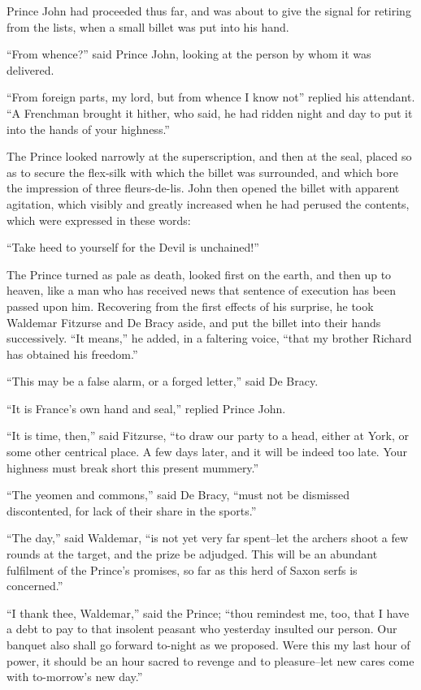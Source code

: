 Prince John had proceeded thus far, and was about to give the signal for
retiring from the lists, when a small billet was put into his hand.

``From whence?'' said Prince John, looking at the person by whom it was
delivered.

``From foreign parts, my lord, but from whence I know not'' replied his
attendant. ``A Frenchman brought it hither, who said, he had ridden
night and day to put it into the hands of your highness.''

The Prince looked narrowly at the superscription, and then at the seal,
placed so as to secure the flex-silk with which the billet was
surrounded, and which bore the impression of three fleurs-de-lis. John
then opened the billet with apparent agitation, which visibly and
greatly increased when he had perused the contents, which were expressed
in these words:

``Take heed to yourself for the Devil is unchained!''

The Prince turned as pale as death, looked first on the earth, and then
up to heaven, like a man who has received news that sentence of
execution has been passed upon him. Recovering from the first effects of
his surprise, he took Waldemar Fitzurse and De Bracy aside, and put the
billet into their hands successively. ``It means,'' he added, in a
faltering voice, ``that my brother Richard has obtained his freedom.''

``This may be a false alarm, or a forged letter,'' said De Bracy.

``It is France's own hand and seal,'' replied Prince John.

``It is time, then,'' said Fitzurse, ``to draw our party to a head,
either at York, or some other centrical place. A few days later, and it
will be indeed too late. Your highness must break short this present
mummery.''

``The yeomen and commons,'' said De Bracy, ``must not be dismissed
discontented, for lack of their share in the sports.''

``The day,'' said Waldemar, ``is not yet very far spent--let the archers
shoot a few rounds at the target, and the prize be adjudged. This will
be an abundant fulfilment of the Prince's promises, so far as this herd
of Saxon serfs is concerned.''

``I thank thee, Waldemar,'' said the Prince; ``thou remindest me, too,
that I have a debt to pay to that insolent peasant who yesterday
insulted our person. Our banquet also shall go forward to-night as we
proposed. Were this my last hour of power, it should be an hour sacred
to revenge and to pleasure--let new cares come with to-morrow's new
day.''

